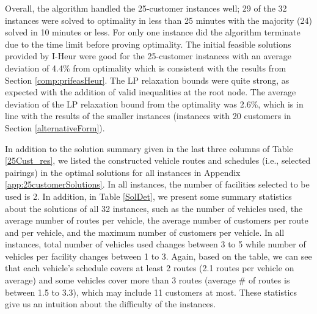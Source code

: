 Overall, the algorithm handled the 25-customer instances well; 29 of the
32 instances were solved to optimality in less than 25 minutes with the majority (24)
solved in 10 minutes or less. For only one instance did the algorithm terminate due to the
time limit before proving optimality. The initial feasible solutions provided by I-Heur
were good for the 25-customer instances with an average deviation of 4.4\% from optimality
which is consistent with the results from Section \ref{comp:prifeasHeur}.
The LP relaxation bounds were quite strong, as expected with the addition of valid inequalities
at the root node. The average deviation of the LP relaxation bound from the optimality
was 2.6\%, which is in line with the results of the smaller instances (instances with 20 customers
in Section \ref{alternativeForm}).

In addition to the solution summary given in the last three columns of Table \ref{25Cust_res},
we listed the constructed vehicle routes and schedules (i.e., selected pairings) in the optimal
solutions for all instances in Appendix \ref{app:25customerSolutions}. In all instances, the
number of facilities selected to be used is 2. In addition, in Table \ref{SolDet}, we present
some summary statistics about the solutions of all 32 instances, such as the number of vehicles
used, the average number of routes per vehicle, the average number of customers per route
and per vehicle, and the maximum number of customers per vehicle. In all instances, total number
of vehicles used changes between 3 to 5 while number of vehicles per facility changes between
1 to 3. Again, based on the table, we can see that each vehicle's schedule covers at least 2
routes (2.1 routes per vehicle on average) and some vehicles cover more than 3 routes
(average \# of routes is between 1.5 to 3.3), which may include 11 customers at most.
These statistics give us an intuition about the difficulty of the instances.

